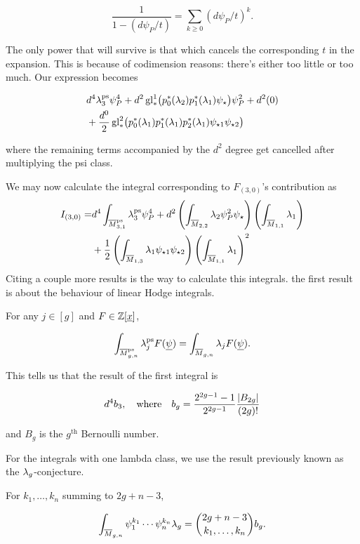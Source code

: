 \documentclass[12pt]{memoir}
\begin{document}
\[\frac{1}{1-(d\psi_P/t)}=\sum_{k\geq 0}(d\psi_P/t)^k.\]

The only power that will survive is that which cancels the corresponding \(t\) in the expansion. This is because of codimension reasons: there's either too little or too much. Our expression becomes

\begin{align*}
     & d^4\lambda_3^{\operatorname{\mathrm{ps}}}\psi_{P}^4+d^2\operatorname{gl}_\ast^1\bigl(p_0^\ast(\lambda_2)p_1^\ast(\lambda_1)\psi_\star\bigr)\psi_P^2+d^2(0)   \\
     & +\frac{d^0}{2}\operatorname{gl}_\ast^2\bigl(p_0^\ast(\lambda_1)p_1^\ast(\lambda_1)p_2^\ast(\lambda_1)\psi_{\star1}\psi_{\star2}\bigr)
\end{align*}

where the remaining terms accompanied by the \(d^2\) degree get cancelled after multiplying the psi class.\par
We may now calculate the integral corresponding to \(F_{(3,0)}\)'s contribution as
\begin{align*}
    I_{(3,0)}= & d^4\int_{\ov{M}^{\ps}_{3,1}}\la_3^{\ps}\psi_{P}^4+d^2\left(\int_{\ov{M}_{2,2}}\la_2\psi_P^2\psi_\star\right)\left(\int_{\ov{M}_{1,1}}\la_1\right) \\
               & +\half\left(\int_{\ov{M}_{1,3}}\la_1\psi_{\star1}\psi_{\star2}\right)\left(\int_{\ov{M}_{1,1}}\la_1\right)^2
\end{align*}
Citing a couple more results is the way to calculate this integrals. the first result is about the behaviour of linear Hodge integrals.

\begin{Th}\label{th-renzoco-only-one-pslambda}
    For any \(j\in[g]\) and \(F\in\mathbb{Z}[\underline x]\),

    \[\int_{\overline{M}_{g,n}^{\operatorname{\mathrm{ps}}}}\lambda_j^{\operatorname{\mathrm{ps}}}F(\underline{\psi})=\int_{\overline{M}_{g,n}}\lambda_jF(\underline{\psi}).\]

\end{Th}

This tells us that the result of the first integral is

\[d^4b_3,\quad\text{where}\quad b_g=\frac{2^{2g-1}-1}{2^{2g-1}}\frac{|B_{2g}|}{(2g)!}\]

and \(B_g\) is the \(g^{\text{th}}\) Bernoulli number.\par
For the integrals with one lambda class, we use the result previously known as the \(\lambda_g\)-conjecture.

\begin{Th}\label{th-lambdagConj}
    For \(k_1,\dots,k_n\) summing to \(2g+n-3\),

    \[\int_{\overline{M}_{g,n}}\psi_1^{k_1}\cdots\psi_n^{k_n}\lambda_g=\binom{2g+n-3}{k_1,\dots,k_n}b_g.\]

\end{Th}
\end{document}
